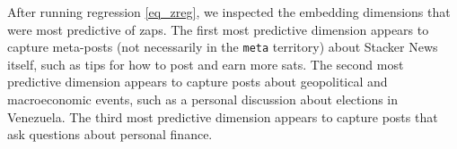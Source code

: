 After running regression \eqref{eq_zreg}, we inspected the embedding dimensions that were most predictive of zaps. The first most predictive dimension appears to capture meta-posts (not necessarily in the \texttt{meta} territory) about Stacker News itself, such as tips for how to post and earn more sats. The second most predictive dimension appears to capture posts about geopolitical and macroeconomic events, such as a personal discussion about elections in Venezuela. The third most predictive dimension appears to capture posts that ask questions about personal finance.